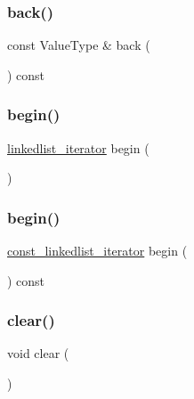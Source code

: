 \subsubsection{\texorpdfstring{back()}{back()}\hspace{0.1cm}{\footnotesize\ttfamily [2/2]}}
{\footnotesize\ttfamily const Value\+Type \& back (\begin{DoxyParamCaption}{ }\end{DoxyParamCaption}) const}

\mbox{\label{classLinkedList_aadd186cc545efe8cf699b4ec5e6402ae}} 
\subsubsection{\texorpdfstring{begin()}{begin()}\hspace{0.1cm}{\footnotesize\ttfamily [1/2]}}
{\footnotesize\ttfamily \mbox{\hyperlink{classLinkedList_1_1linkedlist__iterator}{linkedlist\+\_\+iterator}} begin (\begin{DoxyParamCaption}{ }\end{DoxyParamCaption})\hspace{0.3cm}{\ttfamily [inline]}}

\mbox{\label{classLinkedList_af9ba13847c300fab2067d7a228449947}} 
\subsubsection{\texorpdfstring{begin()}{begin()}\hspace{0.1cm}{\footnotesize\ttfamily [2/2]}}
{\footnotesize\ttfamily \mbox{\hyperlink{classLinkedList_1_1const__linkedlist__iterator}{const\+\_\+linkedlist\+\_\+iterator}} begin (\begin{DoxyParamCaption}{ }\end{DoxyParamCaption}) const\hspace{0.3cm}{\ttfamily [inline]}}

\mbox{\label{classLinkedList_ac8bb3912a3ce86b15842e79d0b421204}} 
\subsubsection{\texorpdfstring{clear()}{clear()}}
{\footnotesize\ttfamily void clear (\begin{DoxyParamCaption}{ }\end{DoxyParamCaption})}

